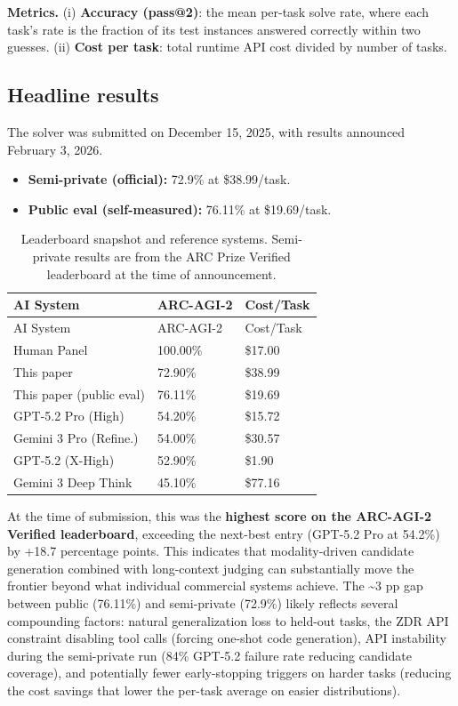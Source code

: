 \documentclass[10pt]{article}
\providecommand{\tightlist}{%
  \setlength{\itemsep}{0pt}\setlength{\parskip}{0pt}}
\begin{document}
\textbf{Metrics.} (i) \textbf{Accuracy (pass@2)}: the mean per-task
solve rate, where each task's rate is the fraction of its test instances
answered correctly within two guesses. (ii) \textbf{Cost per task}:
total runtime API cost divided by number of tasks.

\hypertarget{headline-results}{%
\subsection{Headline results}\label{headline-results}}

The solver was submitted on December 15, 2025, with results announced
February 3, 2026.

\begin{itemize}
\tightlist
\item
  \textbf{Semi-private (official):} 72.9\% at \$38.99/task.
\item
  \textbf{Public eval (self-measured):} 76.11\% at \$19.69/task.
\end{itemize}

\begin{longtable}[]{@{}lll@{}}
\caption{Leaderboard snapshot and reference systems. Semi-private
results are from the ARC Prize Verified leaderboard at the time of
announcement.}\tabularnewline
\toprule\noalign{}
AI System & ARC-AGI-2 & Cost/Task \\
\midrule\noalign{}
\endfirsthead
\toprule\noalign{}
AI System & ARC-AGI-2 & Cost/Task \\
\midrule\noalign{}
\endhead
\bottomrule\noalign{}
\endlastfoot
Human Panel & 100.00\% & \$17.00 \\
This paper & 72.90\% & \$38.99 \\
This paper (public eval) & 76.11\% & \$19.69 \\
GPT-5.2 Pro (High) & 54.20\% & \$15.72 \\
Gemini 3 Pro (Refine.) & 54.00\% & \$30.57 \\
GPT-5.2 (X-High) & 52.90\% & \$1.90 \\
Gemini 3 Deep Think & 45.10\% & \$77.16 \\
\end{longtable}

At the time of submission, this was the \textbf{highest score on the
ARC-AGI-2 Verified leaderboard}, exceeding the next-best entry (GPT-5.2
Pro at 54.2\%) by +18.7 percentage points. This indicates that
modality-driven candidate generation combined with long-context judging
can substantially move the frontier beyond what individual commercial
systems achieve. The \textasciitilde3 pp gap between public (76.11\%)
and semi-private (72.9\%) likely reflects several compounding factors:
natural generalization loss to held-out tasks, the ZDR API constraint
disabling tool calls (forcing one-shot code generation), API instability
during the semi-private run (84\% GPT-5.2 failure rate reducing
candidate coverage), and potentially fewer early-stopping triggers on
harder tasks (reducing the cost savings that lower the per-task average
on easier distributions).
\end{document}
